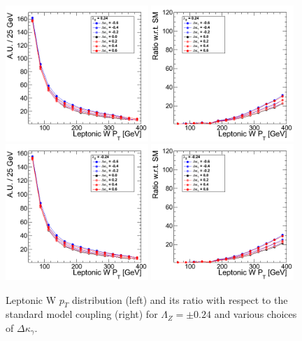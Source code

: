 \begin{figure}[h!t]
  {\centering
    \includegraphics[width=0.48\textwidth]{figs/LeptonicWpT_024.png}
    \includegraphics[width=0.48\textwidth]{figs/LeptonicWpT_024_ratio.png}
    \includegraphics[width=0.48\textwidth]{figs/LeptonicWpT_m024.png}
    \includegraphics[width=0.48\textwidth]{figs/LeptonicWpT_m024_ratio.png}
    \caption{Leptonic W $p_T$ distribution (left) and its ratio with respect to 
    the standard model coupling (right) for $\Lambda_Z = \pm 0.24$ and various choices of $\Delta{\kappa_\gamma}$.}
    \label{fig:ww_LeptonicWpT_atgcRatio024}}
\end{figure}
